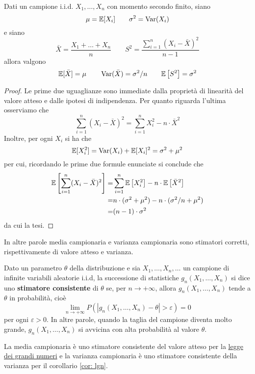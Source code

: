\begin{proposition}
	Dati un campione i.i.d. $X_1, \dots, X_n$ con momento secondo finito, siano
	\[ \mu = \mathbb{E}[X_i] \quad \quad \sigma^2 = \operatorname{Var}(X_i) \]
	e siano
	\[
		\bar{X} = \frac{X_1 + \dots + X_n}{n} \quad \quad
		S^2 = \dfrac{\sum_{i=1}^n (X_i - \bar{X})^2}{n-1}
	\]
	allora valgono
	\[
		\mathbb{E}[\bar{X}] = \mu \quad \quad
		\operatorname{Var}(\bar{X}) = \sigma^2 / n \quad \quad
		\mathbb{E} \left[ S^2 \right] = \sigma^2
	\]
	\begin{proof}
		Le prime due uguaglianze sono immediate dalla proprietà di linearità del valore atteso e
		dalle ipotesi di indipendenza. Per quanto riguarda l'ultima osserviamo che
		\[ \sum_{i=1}^n (X_i - \bar{X})^2 = \sum_{i=1}^n X_i^2 - n \cdot \bar{X}^2 \]
		Inoltre, per ogni $X_i$ si ha che
		\[ \mathbb{E}[X_i^2] = \operatorname{Var}(X_i) + \mathbb{E}[X_i]^2 = \sigma^2 + \mu^2 \]
		per cui, ricordando le prime due formule enunciate si conclude che
		\begin{align*}
			\mathbb{E} \left[ \sum_{i=1}^n (X_i - \bar{X})^2 \right]
			= & \sum_{i=1}^n \mathbb{E} \left[ X_i^2 \right] - n \cdot \mathbb{E} \left[ \bar{X}^2 \right] \\
			= & n \cdot (\sigma^2 + \mu^2) - n \cdot (\sigma^2 / n + \mu^2)                \\
			= & (n-1) \cdot \sigma^2
		\end{align*}
		da cui la tesi.
	\end{proof}
\end{proposition}

In altre parole media campionaria e varianza campionaria sono stimatori corretti,
rispettivamente di valore atteso e varianza.

\begin{definition}\label{def: stimatore consistente}
	Dato un parametro $\theta$ della distribuzione e sia $X_1, \dots, X_n, \dots$ un campione di
	infinite variabili aleatorie i.i.d, la successione di statistiche $g_n(X_1, \dots, X_n)$ si
	dice uno \textbf{stimatore consistente} di $\theta$ se, per $n \to +\infty$, allora
	$g_n(X_1, \dots, X_n)$ tende a $\theta$ in probabilità, cioè
	\[ \lim_{n \to +\infty} P(|g_n(X_1, \dots, X_n) - \theta| > \varepsilon) = 0 \]
	per ogni $\varepsilon > 0$. In altre parole, quando la taglia del campione diventa molto
	grande, $g_n(X_1, \dots, X_n)$ si avvicina con alta probabilità al valore $\theta$.
\end{definition}

La media campionaria è uno stimatore consistente del valore atteso per la
\hyperref[th: lgn]{legge dei grandi numeri} e la varianza campionaria è uno stimatore consistente
della varianza per il corollario \ref{cor: lgn}.

